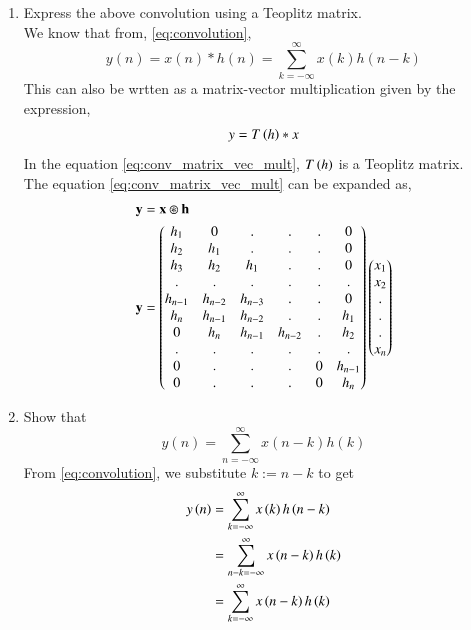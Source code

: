\documentclass[journal,12pt,twocolumn]{IEEEtran}
\renewcommand\thesection{\arabic{section}}
\begin{document}
\begin{enumerate}[label=\thesection.\arabic*]
\begin{figure}[!ht]
	\label{fig:hndef}
	\end{figure}
\\
\item Express the above convolution using a Teoplitz matrix.
\\\solution
We know that from, \eqref{eq:convolution},
\begin{equation}
	y(n) = x(n)*h(n) = \sum_{k=-\infty}^{\infty}x(k)h(n-k)
\end{equation}
This can also be wrtten as a matrix-vector multiplication given by the expression,
\begin{equation}
	\label{eq:conv_matrix_vec_mult}
	y = T\left(h\right)*x
\end{equation}
In the equation \eqref{eq:conv_matrix_vec_mult}, $T\left(h\right)$ is a Teoplitz matrix.
\\ The equation \eqref{eq:conv_matrix_vec_mult} can be expanded as,
\begin{align}
	\mathbf{y} &= \mathbf{x} \circledast \mathbf{h}\\
	\mathbf{y} &= 
	\begin{pmatrix}
		h_1 & 0 & . & . & . & 0 \\
		h_2 & h_1 & . & . & . & 0 \\
		h_3 & h_2 & h_1 & . & . & 0 \\
		. & . & . & . & . & . \\
		h_{n-1} & h_{n-2} & h_{n-3} & . & . & 0\\
		h_{n} & h_{n-1} & h_{n-2} & . & . & h_1\\
		0 & h_{n} & h_{n-1} & h_{n-2} & . & h_2\\
		. & . & . & . & . & . \\
		0 & . & . & . & 0 & h_{n-1} \\
		0 & . & . & . & 0 & h_n \\
	\end{pmatrix}
	\begin{pmatrix}
		x_1 \\ x_2 \\ .\\.\\. \\ x_n
	\end{pmatrix}
\end{align}
\item Show that
\begin{equation}
y(n) =  \sum_{n=-\infty}^{\infty}x(n-k)h(k)
\end{equation}
\solution
From \eqref{eq:convolution}, we substitute $k := n - k$ to get
\begin{align}
y\left(n\right) &= \sum_{k=-\infty}^{\infty}x\left(k\right)h\left(n - k\right) \\
		  &= \sum_{n - k=-\infty}^{\infty}x\left(n - k\right)h\left(k\right) \\
		  &= \sum_{k=-\infty}^{\infty}x\left(n - k\right)h\left(k\right)
\end{align}
\end{enumerate}
%
\end{document}

